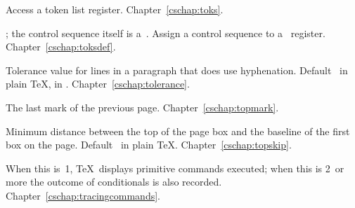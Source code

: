 \begin{glossinventory}
\item [\cs{toks\gr{8-bit number}}]
      Access a token list register.
Chapter~\ref{cschap:toks}.

\item [\cs{toksdef\gr{control sequence}\gr{equals}\gr{8-bit number}}]
      ; the control sequence
      itself is a~.
      Assign a control sequence to
      a~ register.
Chapter~\ref{cschap:toksdef}.

\item [\cs{tolerance}]
      Tolerance value for lines in a paragraph that does use hyphenation. 
      Default~ in plain \TeX,  in \IniTeX.
Chapter~\ref{cschap:tolerance}.

\item [\cs{topmark}]
      The last mark of the previous page.
Chapter~\ref{cschap:topmark}.

\item [\cs{topskip}]
      Minimum distance between the top of the page box
      and the baseline of the first box on the page. 
      Default~\n{10pt} in plain \TeX.
Chapter~\ref{cschap:topskip}.

\item [\cs{tracingcommands}]
      When this is~1, \TeX\ displays primitive commands executed; 
      when this is 2~or more the outcome of conditionals is also recorded.
Chapter~\ref{cschap:tracingcommands}.


\end{glossinventory}
